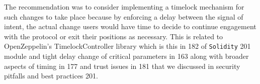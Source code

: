 \begin{itemize}
  The recommendation was to consider implementing a timelock mechanism
  for such changes to take place because by enforcing a delay between
  the signal of intent, the actual change users would have time to
  decide to continue engagement with the protocol or exit their
  positions as necessary. This is related to OpenZeppelin's
  TimelockController library which is this in 182 of \texttt{Solidity}
  201 module and tight delay change of critical parameters in 163 along
  with broader aspects of timing in 177 and trust issues in 181 that we
  discussed in security pitfalls and best practices 201.
\end{itemize}
